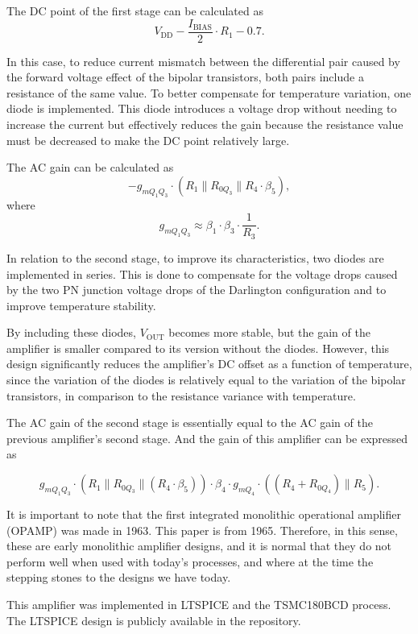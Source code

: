 \documentclass[12pt]{article}
\begin{document}
The DC point of the first stage can be calculated as  
\[
V_{\text{DD}} - \frac{I_{\text{BIAS}}}{2} \cdot R_1 - 0.7.
\]  

In this case, to reduce current mismatch between the differential pair caused by the forward voltage effect of the bipolar transistors, both pairs include a resistance of the same value. To better compensate for temperature variation, one diode is implemented. This diode introduces a voltage drop without needing to increase the current but effectively reduces the gain because the resistance value must be decreased to make the DC point relatively large.  

The AC gain can be calculated as  
\[
-g_{mQ_1Q_3} \cdot \left( R_1 \parallel R_{0Q_3} \parallel R_4 \cdot \beta_5 \right),
\]  
where  
\[
g_{mQ_1Q_3} \approx \beta_1 \cdot \beta_3 \cdot \frac{1}{R_3}.
\]

In relation to the second stage, to improve its characteristics, two diodes are implemented in series. This is done to compensate for the voltage drops caused by the two PN junction voltage drops of the Darlington configuration and to improve temperature stability.  

By including these diodes, $V_{\text{OUT}}$ becomes more stable, but the gain of the amplifier is smaller compared to its version without the diodes. However, this design significantly reduces the amplifier's DC offset as a function of temperature, since the variation of the diodes is relatively equal to the variation of the bipolar transistors, in comparison to the resistance variance with temperature.  

The AC gain of the second stage is essentially equal to the AC gain of the previous amplifier's second stage.
And the gain of this amplifier can be expressed as  

\[
g_{mQ_1Q_3} \cdot \left( R_1 \parallel R_{0Q_3} \parallel \left( R_4 \cdot \beta_5 \right) \right) \cdot \beta_4 \cdot g_{mQ_4} \cdot \left( \left( R_4 + R_{0Q_4} \right) \parallel R_5 \right).
\]


It is important to note that the first integrated monolithic operational amplifier (OPAMP) was made in 1963. This paper is from 1965. Therefore, in this sense, these are early monolithic amplifier designs, and it is normal that they do not perform well when used with today’s processes, and where at the time the stepping stones to the designs we have today.  

This amplifier was implemented in LTSPICE and the TSMC180BCD process. The LTSPICE design is publicly available in the repository.
\end{document}
